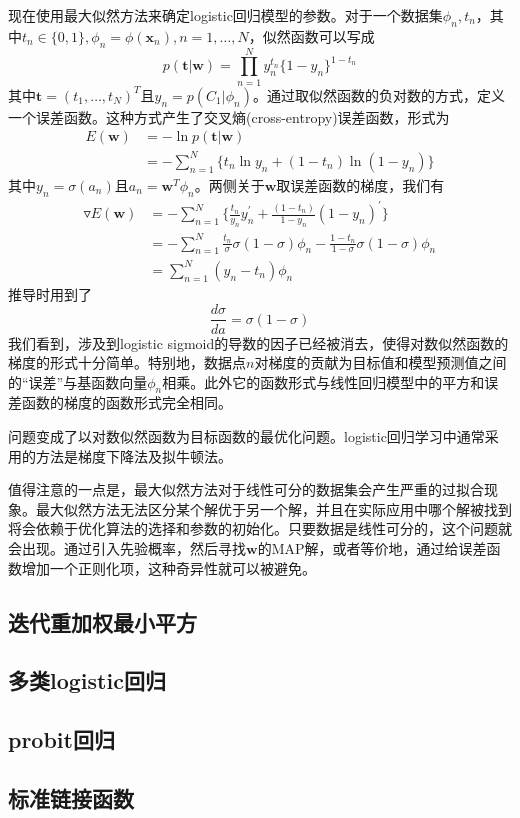 现在使用最大似然方法来确定logistic回归模型的参数。对于一个数据集$\phi_n,t_n$，其中$t_n\in \{0,1\},\phi_n=\phi(\boldsymbol{x}_n),n=1,\dots,N$，似然函数可以写成
\begin{equation}
	p(\boldsymbol{t}|\boldsymbol{w})=\prod_{n=1}^{N}y_n^{t_n}\{1-y_n \}^{1-t_n}
\end{equation}
其中$\boldsymbol{t}=(t_1,\dots,t_N)^T$且$y_n=p(C_1|\phi_n)$。通过取似然函数的负对数的方式，定义一个误差函数。这种方式产生了交叉熵(cross-entropy)误差函数，形式为
\begin{equation}
	\begin{aligned}
	E(\boldsymbol{w})&=-\ln p(\boldsymbol{t}|\boldsymbol{w})\\
	&=-\sum_{n=1}^{N}\{t_n\ln y_n+(1-t_n)\ln (1-y_n) \}
	\end{aligned}
\end{equation}
其中$y_n=\sigma(a_n)$且$a_n=\boldsymbol{w}^T\phi_n$。两侧关于$\boldsymbol{w}$取误差函数的梯度，我们有
\begin{equation}
\begin{aligned}
	\triangledown E(\boldsymbol{w})&=-\sum_{n=1}^{N}\{\frac{t_n}{y_n}y_n^{'}+\frac{(1-t_n)}{1-y_n}(1-y_n)^{'} \}\\
	&=-\sum_{n=1}^{N}\frac{t_n}{\sigma}\sigma(1-\sigma)\phi_n - \frac{1-t_n}{1-\sigma}\sigma(1-\sigma)\phi_n\\
	&=\sum_{n=1}^{N}(y_n-t_n)\phi_n
\end{aligned}
\end{equation}
推导时用到了
\begin{equation}
	\frac{d\sigma}{da}=\sigma(1-\sigma)
\end{equation}
我们看到，涉及到logistic sigmoid的导数的因子已经被消去，使得对数似然函数的梯度的形式十分简单。特别地，数据点$n$对梯度的贡献为目标值和模型预测值之间的“误差”与基函数向量$\phi_n$相乘。此外它的函数形式与线性回归模型中的平方和误差函数的梯度的函数形式完全相同。

问题变成了以对数似然函数为目标函数的最优化问题。logistic回归学习中通常采用的方法是梯度下降法及拟牛顿法。

值得注意的一点是，最大似然方法对于线性可分的数据集会产生严重的过拟合现象。最大似然方法无法区分某个解优于另一个解，并且在实际应用中哪个解被找到将会依赖于优化算法的选择和参数的初始化。只要数据是线性可分的，这个问题就会出现。通过引入先验概率，然后寻找$\boldsymbol{w}$的MAP解，或者等价地，通过给误差函数增加一个正则化项，这种奇异性就可以被避免。
\subsection*{迭代重加权最小平方}
\subsection*{多类logistic回归}
\subsection*{probit回归}
\subsection*{标准链接函数}
